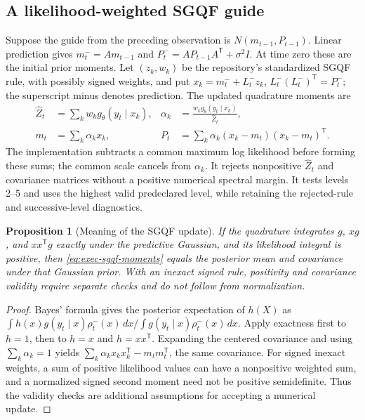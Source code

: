 \documentclass[11pt]{article}
\newtheorem{proposition}{Proposition}
\begin{document}
\subsection{A likelihood-weighted SGQF guide}

Suppose the guide from the preceding observation is $N(m_{t-1},P_{t-1})$.
Linear prediction gives $m_t^-=A m_{t-1}$ and
$P_t^-=A P_{t-1}A^{\mathsf T}+\sigma^2I$. At time zero these are the initial
prior moments. Let $(z_k,w_k)$ be the repository's standardized SGQF rule,
with possibly signed weights, and put
$x_k=m_t^-+L_t^-z_k$, $L_t^-(L_t^-)^{\mathsf T}=P_t^-$; the superscript minus denotes prediction.
The updated quadrature moments are
\begin{align}
 \widehat Z_t&=\sum_k w_k g_\theta(y_t\mid x_k),&
 \alpha_k&=\frac{w_k g_\theta(y_t\mid x_k)}{\widehat Z_t},\label{eq:exec-sgqf-mass}\\
 m_t&=\sum_k\alpha_k x_k,&
 P_t&=\sum_k\alpha_k(x_k-m_t)(x_k-m_t)^{\mathsf T}.\label{eq:exec-sgqf-moments}
\end{align}
The implementation subtracts a common maximum log likelihood before forming
these sums; the common scale cancels from $\alpha_k$. It rejects nonpositive
$\widehat Z_t$ and covariance matrices without a positive numerical spectral
margin. It tests levels 2--5 and uses the highest valid predeclared level,
while retaining the rejected-rule and successive-level diagnostics.

\begin{proposition}[Meaning of the SGQF update]
\label{prop:exec-sgqf}
If the quadrature integrates $g$, $xg$, and $xx^{\mathsf T}g$ exactly under
the predictive Gaussian, and its likelihood integral is positive, then
\eqref{eq:exec-sgqf-moments} equals the posterior mean and covariance under
that Gaussian prior. With an inexact signed rule, positivity and covariance
validity require separate checks and do not follow from normalization.
\end{proposition}
\begin{proof}
Bayes' formula gives the posterior expectation of $h(X)$ as
$\int h(x)g(y_t\mid x)\rho_t^-(x)\,dx/
\int g(y_t\mid x)\rho_t^-(x)\,dx$.
Apply exactness first to $h=1$, then to $h=x$ and $h=xx^{\mathsf T}$.
Expanding the centered covariance and using $\sum_k\alpha_k=1$ yields
$\sum_k\alpha_kx_kx_k^{\mathsf T}-m_tm_t^{\mathsf T}$, the same covariance.
For signed inexact weights, a sum of positive likelihood values can have a
nonpositive weighted sum, and a normalized signed second moment need not be
positive semidefinite. Thus the validity checks are additional assumptions
for accepting a numerical update.
\end{proof}
\end{document}
